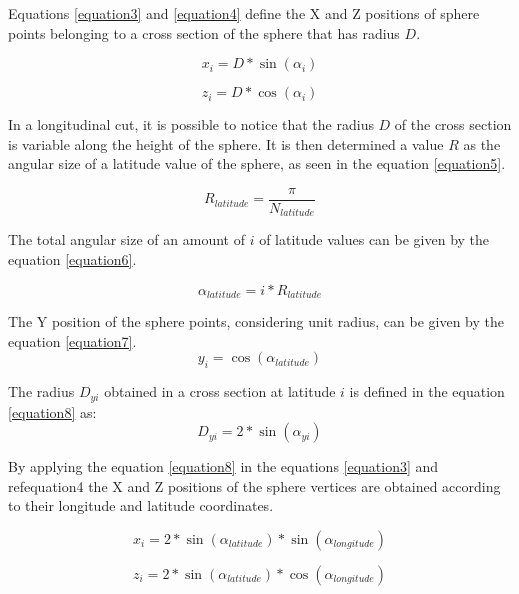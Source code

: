 \documentclass[runningheads]{llncs}
\begin{document}
Equations \ref{equation3} and \ref{equation4} define the X and Z positions of sphere points belonging to a cross section of the sphere that has radius $D$.

\begin{equation}
x_{i} = D * \sin(\alpha_{i})
\label{equation3}
\end{equation}

\begin{equation}
z_{i} = D * \cos(\alpha_{i})
\label{equation4}
\end{equation}

In a longitudinal cut, it is possible to notice that the radius $D$ of the cross section is variable along the height of the sphere. It is then determined a value $R$ as the angular size of a latitude value of the sphere, as seen in the equation \ref{equation5}.

\begin{equation}
R_{latitude} = \frac{\pi}{ N_{latitude}}
\label{equation5}
\end{equation}

The total angular size of an amount of $i$ of latitude values can be given by the equation \ref{equation6}.

\begin{equation}
\alpha_{latitude} = i * R_{latitude}
\label{equation6}
\end{equation}

The Y position of the sphere points, considering unit radius, can be given by the equation \ref{equation7}.
\begin{equation}
y_{i} = \cos(\alpha_{latitude})
\label{equation7}
\end{equation}

The radius $D_{yi}$ obtained in a cross section at latitude $i$ is defined in the equation \ref{equation8} as:
\begin{equation}
D_{yi} = 2 * \sin(\alpha_{yi})
\label{equation8}
\end{equation}

By applying the equation \ref{equation8} in the equations \ref{equation3} and ref{equation4} the X and Z positions of the sphere vertices are obtained according to their longitude and latitude coordinates.

\begin{equation}
x_{i} = 2 * \sin(\alpha_{latitude}) * \sin(\alpha_{longitude})
\label{equation9}
\end{equation}

\begin{equation}
z_{i} = 2 * \sin(\alpha_{latitude}) * \cos(\alpha_{longitude})
\label{equation10}
\end{equation}
\end{document}
